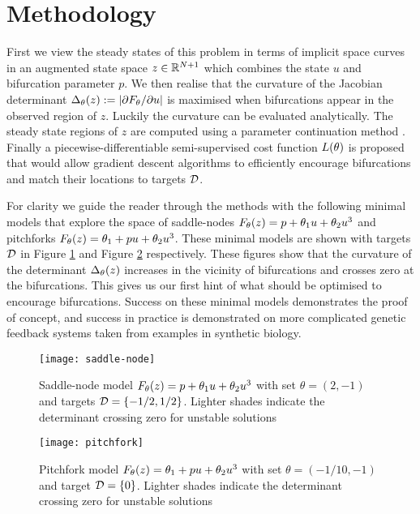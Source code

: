 \section{Methodology}
First we view the steady states of this problem in terms of implicit space curves \cite{Goldman2005CurvatureSurfaces} in an augmented state space $z\in\mathbb{R}^{N+1}$ which combines the state $u$ and bifurcation parameter $p$. We then realise that the curvature of the Jacobian determinant $\Delta_{\theta}(z):=|\partial F_{\theta}/\partial u|$ is maximised when bifurcations appear in the observed region of $z$. Luckily the curvature can be evaluated analytically. The steady state regions of $z$ are computed using a parameter continuation method \cite{Veltz2019PseudoArcLengthContinuation.jl,Farrell2016TheDiagrams}. Finally a piecewise-differentiable semi-supervised cost function $L(\theta)$ is proposed that would allow gradient descent algorithms to efficiently encourage bifurcations and match their locations to targets $\mathcal{D}$.

For clarity we guide the reader through the methods with the following minimal models that explore the space of saddle-nodes $F_{\theta}(z) = p + \theta_{1}u+\theta_{2}u^3$ and pitchforks $F_{\theta}(z) = \theta_{1} + p u+\theta_{2}u^3$. These minimal models are shown with targets $\mathcal{D}$ in Figure \ref{fig:saddle-node} and Figure \ref{fig:pitchfork} respectively. These figures show that the curvature of the determinant $\Delta_{\theta}(z)$ increases in the vicinity of bifurcations and crosses zero at the bifurcations. This gives us our first hint of what should be optimised to encourage bifurcations. Success on these minimal models demonstrates the proof of concept, and success in practice is demonstrated on more complicated genetic feedback systems taken from examples in synthetic biology.
\begin{figure}[H]
\centering{}
\captionsetup{justification=centering}
\texttt{[image: saddle-node]}
\caption{Saddle-node model $F_{\theta}(z) = p + \theta_{1}u+\theta_{2}u^3$ with set $\theta=(2,-1)$ and targets $\mathcal{D}=\{-1/2,1/2\}$. Lighter shades indicate the determinant crossing zero for unstable solutions}
\label{fig:saddle-node}
\end{figure}
\begin{figure}[H]
\centering{}
\captionsetup{justification=centering}
\texttt{[image: pitchfork]}
\caption{Pitchfork model $F_{\theta}(z) = \theta_{1} + p u+\theta_{2}u^3$ with set $\theta=(-1/10,-1)$ and target $\mathcal{D}=\{0\}$. Lighter shades indicate the determinant crossing zero for unstable solutions}
\label{fig:pitchfork}
\end{figure}

